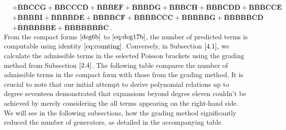 \documentclass[10pt]{amsart}
\theoremstyle{definition}
\theoremstyle{corollary}
\theoremstyle{remark}
\theoremstyle{conclusion}
\begin{document}
\begin{align}
	&+\bar{\mathbf{B}}\bar{\mathbf{B}}\bar{\mathbf{C}}\bar{\mathbf{C}}\bar{\mathbf{G}}+\bar{\mathbf{B}}\bar{\mathbf{B}}\bar{\mathbf{C}}\bar{\mathbf{C}}\bar{\mathbf{C}}\bar{\mathbf{D}}+\bar{\mathbf{B}}\bar{\mathbf{B}}\bar{\mathbf{B}}\bar{\mathbf{E}}\bar{\mathbf{F}}+\bar{\mathbf{B}}\bar{\mathbf{B}}\bar{\mathbf{B}}\bar{\mathbf{D}}\bar{\mathbf{G}}+\bar{\mathbf{B}}\bar{\mathbf{B}}\bar{\mathbf{B}}\bar{\mathbf{C}}\bar{\mathbf{H}}+\bar{\mathbf{B}}\bar{\mathbf{B}}\bar{\mathbf{B}}\bar{\mathbf{C}}\bar{\mathbf{D}}\bar{\mathbf{D}}+\bar{\mathbf{B}}\bar{\mathbf{B}}\bar{\mathbf{B}}\bar{\mathbf{C}}\bar{\mathbf{C}}\bar{\mathbf{E}}\nonumber \\
	&+\bar{\mathbf{B}}\bar{\mathbf{B}}\bar{\mathbf{B}}\bar{\mathbf{B}}\bar{\mathbf{I}}+\bar{\mathbf{B}}\bar{\mathbf{B}}\bar{\mathbf{B}}\bar{\mathbf{B}}\bar{\mathbf{D}}\bar{\mathbf{E}}+\bar{\mathbf{B}}\bar{\mathbf{B}}\bar{\mathbf{B}}\bar{\mathbf{B}}\bar{\mathbf{C}}\bar{\mathbf{F}}+\bar{\mathbf{B}}\bar{\mathbf{B}}\bar{\mathbf{B}}\bar{\mathbf{B}}\bar{\mathbf{C}}\bar{\mathbf{C}}\bar{\mathbf{C}}+\bar{\mathbf{B}}\bar{\mathbf{B}}\bar{\mathbf{B}}\bar{\mathbf{B}}\bar{\mathbf{B}}\bar{\mathbf{G}}+\bar{\mathbf{B}}\bar{\mathbf{B}}\bar{\mathbf{B}}\bar{\mathbf{B}}\bar{\mathbf{B}}\bar{\mathbf{C}}\bar{\mathbf{D}} \nonumber \\
	&+ \bar{\mathbf{B}}\bar{\mathbf{B}}\bar{\mathbf{B}}\bar{\mathbf{B}}\bar{\mathbf{B}}\bar{\mathbf{B}}\bar{\mathbf{E}}+\bar{\mathbf{B}}\bar{\mathbf{B}}\bar{\mathbf{B}}\bar{\mathbf{B}}\bar{\mathbf{B}}\bar{\mathbf{B}}\bar{\mathbf{B}}\bar{\mathbf{C}} \, . \label{eq:deg17b}
\end{align}
\vskip 0.5cm
From the compact forms $\eqref{deg6b}$ to $\eqref{eq:deg17b}$, the number of predicted terms is computable using identity $\eqref{eq:counting}$. Conversely, in Subsection $\ref{4.1},$ we calculate the admissible terms in the selected Poisson brackets using the grading method from Subsection $\ref{2.4}$. The following table compares the number of admissible terms in the compact form with those from the grading method. It is crucial to note that our initial attempt to derive polynomial relations up to degree seventeen demonstrated that expansions beyond degree eleven couldn't be achieved by merely considering the all terms appearing on the right-hand side. We will see in the following subsections, how the grading method significantly reduced the number of generators, as detailed in the accompanying table.
\end{document}
